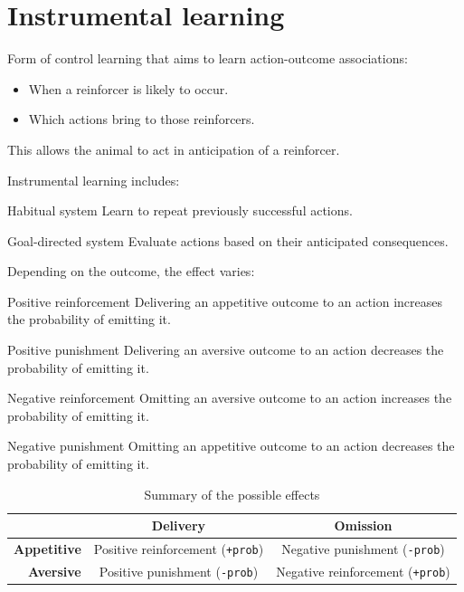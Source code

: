\chapter{Instrumental learning}


Form of control learning that aims to learn action-outcome associations:
\begin{itemize}
    \item When a reinforcer is likely to occur.
    \item Which actions bring to those reinforcers.
\end{itemize}
This allows the animal to act in anticipation of a reinforcer.

Instrumental learning includes:
\begin{descriptionlist}
    \item[Habitual system] 
        Learn to repeat previously successful actions.
    \item[Goal-directed system] 
        Evaluate actions based on their anticipated consequences.
\end{descriptionlist}

Depending on the outcome, the effect varies:
\begin{descriptionlist}
    \item[Positive reinforcement] 
        Delivering an appetitive outcome to an action increases the probability of emitting it.

    \item[Positive punishment] 
        Delivering an aversive outcome to an action decreases the probability of emitting it.
    
    \item[Negative reinforcement] 
        Omitting an aversive outcome to an action increases the probability of emitting it.
    
    \item[Negative punishment] 
        Omitting an appetitive outcome to an action decreases the probability of emitting it.
\end{descriptionlist}

\begin{table}[H]
    \centering
    \begin{tabular}{r|cc}
        \toprule
                            & \textbf{Delivery}                         & \textbf{Omission} \\
        \midrule
        \textbf{Appetitive} & Positive reinforcement (\texttt{+prob})   & Negative punishment (\texttt{-prob}) \\
        \textbf{Aversive}   & Positive punishment (\texttt{-prob})      & Negative reinforcement (\texttt{+prob}) \\
        \bottomrule
    \end{tabular}
    \caption{Summary of the possible effects}
\end{table}



